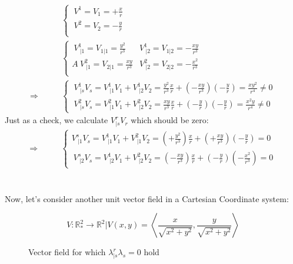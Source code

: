 \begin{align}
\ & \left \{ \begin{array}{c}
\ V^1 = V_1 = +\frac{x}{r}\\
\ V^2 = V_2 = -\frac{y}{r}\\
\end{array}\right.\\
\ & \left \{ \begin{array}{cc}
\ V^1_{\ |1} =  V_{1|1} = \frac{y^2}{r^3}&V^1_{\ |2} =  V_{1|2} = -\frac{xy}{r^3}\\A
\ V^2_{\ |1} =  V_{2|1} = \frac{xy}{r^3}&V^2_{\ |2} =  V_{2|2} = -\frac{x^2}{r^3}\\
\end{array}\right.\\
\Rightarrow \quad\quad &\left \{ \begin{array}{c} \  V^1_{\ |s}V_s = V^1_{\ |1}V_1+V^1_{\ |2}V_2 = \frac{y^2}{r^3}\frac{x}{r}+ (-\frac{xy}{r^3})(-\frac{y}{r}) = \frac{xy^2}{r^4} \ne 0\\
\ V^2_{\ |s}V_s = V^2_{\ |1}V_1+V^2_{\ |2}V_2 = \frac{xy}{r^3}\frac{x}{r}+ (-\frac{y}{r})(-\frac{y}{r}) = \frac{x^2 y}{r^4} \ne 0
\end{array} \right.
\end{align}
Just as a check, we calculate $V^r_{|s}V_r$ which should be zero:
\begin{align}
\Rightarrow \quad\quad &\left \{ \begin{array}{c}V^s_{\ |1}V_s = V^1_{\ |1}V_1+V^2_{\ |1}V_2 = (+\frac{y^2}{r^3})\frac{x}{r}+ (+\frac{xy}{r^3})(-\frac{y}{r}) =0\\
\ V^s_{\ |2}V_s = V^1_{\ |2}V_1+V^2_{\ |2}V_2 = (-\frac{xy}{r^3})\frac{x}{r}+ (-\frac{y}{r})(-\frac{x^2}{r^3}) = 0
\end{array} \right.
\end{align}\\\\
Now, let's consider another unit vector field in a Cartesian Coordinate system:
\begin{figure}[H]

\centering
\begin{minipage}[H]{.4\textwidth}
\vspace{0pt}

\end{minipage}\hfill
\begin{minipage}[H]{0.4\textwidth}
\vspace{50pt}
$$V:\mathbb{R}_*^2\rightarrow \mathbb{R}^2|V(x,y) = \left< \frac{x}{\sqrt{x^2+y^2}},\frac{y}{\sqrt{x^2+y^2}} \right>$$
\end{minipage}
\caption{Vector field for which $\lambda^r_{|s}\lambda_s = 0$ hold}
\label{fig:fig_p62_236_b}
\end{figure}
